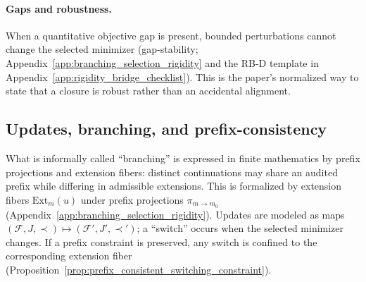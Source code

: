 \paragraph{Gaps and robustness.}
\AuditTag When a quantitative objective gap is present, bounded perturbations cannot change the selected minimizer
(gap-stability; Appendix~\ref{app:branching_selection_rigidity} and the RB-D template in Appendix~\ref{app:rigidity_bridge_checklist}).
This is the paper's normalized way to state that a closure is robust rather than an accidental alignment.

\subsection*{Updates, branching, and prefix-consistency}
\AuditTag What is informally called ``branching'' is expressed in finite mathematics by prefix projections and extension fibers:
distinct continuations may share an audited prefix while differing in admissible extensions.
This is formalized by extension fibers $\mathrm{Ext}_m(u)$ under prefix projections $\pi_{m\to m_0}$ (Appendix~\ref{app:branching_selection_rigidity}).
\AuditTag Updates are modeled as maps $(\mathcal{F},J,\prec)\mapsto(\mathcal{F}',J',\prec')$; a ``switch'' occurs when the selected minimizer changes.
If a prefix constraint is preserved, any switch is confined to the corresponding extension fiber (Proposition~\ref{prop:prefix_consistent_switching_constraint}).


